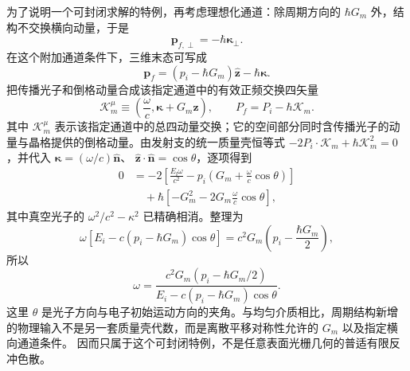 为了说明一个可封闭求解的特例，再考虑理想化通道：除周期方向的 $\hbar G_m$ 外，结构不交换横向动量，于是
\begin{equation*}
\mathbf p_{f,\perp}=-\hbar\boldsymbol\kappa_\perp .
\end{equation*}
在这个附加通道条件下，三维末态可写成
\begin{equation*}
\mathbf p_f=(p_i-\hbar G_m)\hat{\mathbf z}-\hbar\boldsymbol\kappa.
\end{equation*}
把传播光子和倒格动量合成该指定通道中的有效正频交换四矢量
\begin{equation*}
\mathcal K_m^\mu
\equiv
\left(
\frac{\omega}{c},
\boldsymbol\kappa+G_m\hat{\mathbf z}
\right),
\qquad
P_f=P_i-\hbar\mathcal K_m .
\end{equation*}
其中 $\mathcal K_m^\mu$ 表示该指定通道中的总四动量交换；它的空间部分同时含传播光子的动量与晶格提供的倒格动量。由发射支的统一质量壳恒等式
$-2P_i\!\cdot\mathcal K_m+\hbar\mathcal K_m^2=0$，并代入
$\boldsymbol\kappa=(\omega/c)\hat{\mathbf n}$、
$\hat{\mathbf z}\!\cdot\hat{\mathbf n}=\cos\theta$，逐项得到
\begin{align*}
0
&=-2\left[
\frac{E_\ii\omega}{c^2}
-p_i\left(G_m+\frac{\omega}{c}\cos\theta\right)
\right]\\
&\quad
+\hbar\left[
-G_m^2-2G_m\frac{\omega}{c}\cos\theta
\right],
\end{align*}
其中真空光子的 $\omega^2/c^2-\kappa^2$ 已精确相消。整理为
\begin{equation*}
\omega\left[E_i-c(p_i-\hbar G_m)\cos\theta\right]
=c^2G_m\left(p_i-\frac{\hbar G_m}{2}\right),
\end{equation*}
所以
\begin{equation}
\boxed{
\omega
=\frac{c^2G_m\left(p_i-\hbar G_m/2\right)}
{E_i-c\left(p_i-\hbar G_m\right)\cos\theta}.}
\label{eq:smith_purcell_exact_recoil_dispersion}
\end{equation}
这里 $\theta$ 是光子方向与电子初始运动方向的夹角。与均匀介质相比，周期结构新增的物理输入不是另一套质量壳代数，而是离散平移对称性允许的 $G_m$ 以及指定横向通道条件。 因而只属于这个可封闭特例，不是任意表面光栅几何的普适有限反冲色散。

